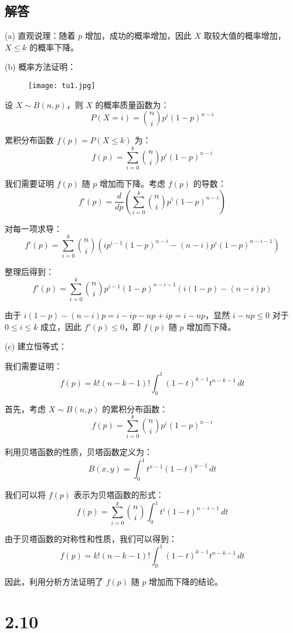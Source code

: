 \documentclass[UTF8]{report}
\theoremstyle{MyLineTheoremStyle} %
\theoremstyle{MyBlockTheoremStyle} %
\theoremstyle{MySubsubsectionStyle} %
\begin{document}
\subsection*{解答}

(a) 直观说理：随着 \(p\) 增加，成功的概率增加，因此 \(X\) 取较大值的概率增加，\(X \leq k\) 的概率下降。

(b) 概率方法证明：

\begin{figure}[H]
    \centering
    \texttt{[image: tu1.jpg]}
\end{figure}

设 \(X \sim B(n, p)\)，则 \(X\) 的概率质量函数为：
\[
P(X = i) = \binom{n}{i} p^i (1-p)^{n-i}
\]

累积分布函数 \(f(p) = P(X \leq k)\) 为：
\[
f(p) = \sum_{i=0}^k \binom{n}{i} p^i (1-p)^{n-i}
\]

我们需要证明 \(f(p)\) 随 \(p\) 增加而下降。考虑 \(f(p)\) 的导数：
\[
f'(p) = \frac{d}{dp} \left( \sum_{i=0}^k \binom{n}{i} p^i (1-p)^{n-i} \right)
\]

对每一项求导：
\[
f'(p) = \sum_{i=0}^k \binom{n}{i} \left( i p^{i-1} (1-p)^{n-i} - (n-i) p^i (1-p)^{n-i-1} \right)
\]

整理后得到：
\[
f'(p) = \sum_{i=0}^k \binom{n}{i} p^{i-1} (1-p)^{n-i-1} \left( i (1-p) - (n-i) p \right)
\]

由于 \(i (1-p) - (n-i) p = i - ip - np + ip = i - np\)，显然 \(i - np \leq 0\) 对于 \(0 \leq i \leq k\) 成立，因此 \(f'(p) \leq 0\)，即 \(f(p)\) 随 \(p\) 增加而下降。

(c) 建立恒等式：

我们需要证明：
\[
f(p) = k! (n-k-1)! \int_0^1 (1-t)^{k-1} t^{n-k-1} \, dt
\]

首先，考虑 \(X \sim B(n, p)\) 的累积分布函数：
\[
f(p) = \sum_{i=0}^k \binom{n}{i} p^i (1-p)^{n-i}
\]

利用贝塔函数的性质，贝塔函数定义为：
\[
B(x, y) = \int_0^1 t^{x-1} (1-t)^{y-1} \, dt
\]

我们可以将 \(f(p)\) 表示为贝塔函数的形式：
\[
f(p) = \sum_{i=0}^k \binom{n}{i} \int_0^1 t^{i} (1-t)^{n-i-1} \, dt
\]

由于贝塔函数的对称性和性质，我们可以得到：
\[
f(p) = k! (n-k-1)! \int_0^1 (1-t)^{k-1} t^{n-k-1} \, dt
\]

因此，利用分析方法证明了 \(f(p)\) 随 \(p\) 增加而下降的结论。



\section{2.10}
\end{document}
